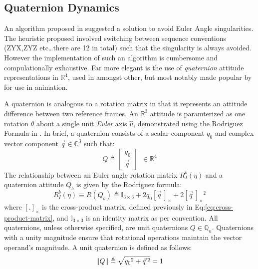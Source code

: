 \subsection{Quaternion Dynamics}
\label{subsec:dynamics.rigidbody.quaternion}
An algorithm proposed in \cite{euleranglesingularity} suggested a solution to avoid Euler Angle singularities. The heuristic proposed involved switching between sequence conventions (ZYX,ZYZ etc\ldots there are 12 in total) such that the singularity is always avoided. However the implementation of such an algorithm is cumbersome and compulationally exhaustive. Far more elegant is the use of \emph{quaternion} attitude representations in $\mathbb{R}^4$, used in \cite{rotationsequences,spacecraftattitutdequaternions} amongst other, but most notably made popular by \cite{shoemake} for use in animation.
\par
A quaternion is analogous to a rotation matrix in that it represents an attitude difference between two reference frames. An $\mathbb{R}^3$ attitude is paramterized as one rotation $\theta$ about a single unit \emph{Euler} axis $\hat{u}$, demonstrated using the Rodriguez Formula in \cite{unwinding}. In brief, a quaternion consists of a scalar component $q_0$ and complex vector component $\vec{q}\in \mathbb{C}^3$ such that:
\begin{equation}
Q\triangleq 
\begin{bmatrix}
q_0 \\
\vec{q}
\end{bmatrix}
~~\in\mathbb{R}^4
\end{equation}
The relationship between an Euler angle rotation matrix $R_I^b(\eta)$ and a quaternion attitude $Q_b$ is given by the Rodriguez formula:
\begin{equation}\label{eq:rodriguez}
R_I^b(\eta)\equiv R(Q_b)\triangleq \mathbb{I}_{3\times 3}+2q_0[\vec{q}\hspace{2pt}]_\times+2[\vec{q}\hspace{2pt}]_\times\text{}^2
\end{equation}
where $[.]_\times$ is the cross-product matrix, defined previously in Eq:\ref{eq:cross-product-matrix}, and $
\mathbb{I}_{3\times 3}$ is an identity matrix as per convention. All quaternions, unless otherwise specified, are unit quaternions $Q\in\mathbb{Q}_u$. Quaternions with a unity magnitude ensure that rotational operations maintain the vector operand's magnitude. A unit quaternion is defined as follows:
\begin{equation}
\left\lVert Q\right\rVert\triangleq\sqrt{{q_0}^2+\vec{q}\text{}\hspace{2pt}^2}=1
\end{equation}

